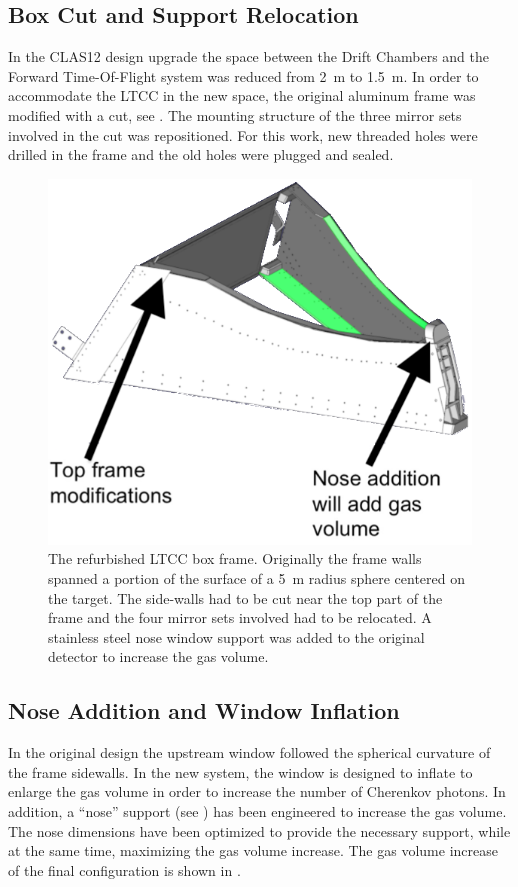 \subsection{Box Cut and Support Relocation }\label{sec:mirrorRepos}

In the CLAS12 design upgrade the space between the Drift Chambers and the Forward Time-Of-Flight system
was reduced from 2~m to 1.5~m.
In order to accommodate the LTCC in the new space, the original aluminum frame was modified with a cut, see .
The mounting structure of the three mirror sets involved in the cut was repositioned. For this work, new threaded holes were
drilled in the frame and the old holes were plugged and sealed.

\begin{figure}
	\centering
	\includegraphics[width=1.0\columnwidth, height=0.75\columnwidth]{img/boxCut.png}
	\caption{The refurbished LTCC box frame. Originally the frame walls spanned a portion of the surface of a 5~m
          radius sphere centered on the target. The side-walls had to be cut near the top part of the frame and the four
          mirror sets involved had to be relocated. A stainless steel nose window support was added to the original detector
          to increase the gas volume.}
	\label{fig:boxCut}
\end{figure}

\subsection{Nose Addition and Window Inflation}

In the original design the upstream window followed the spherical curvature of the frame sidewalls. In the new system, the window is
designed to inflate to enlarge the gas volume in order to increase the number of Cherenkov photons. In addition, a ``nose''
support (see ) has been engineered to increase the gas volume.
The nose dimensions have been optimized to provide the necessary support, while at the same time, maximizing the gas volume increase.
The gas volume increase of the final configuration is shown in .

